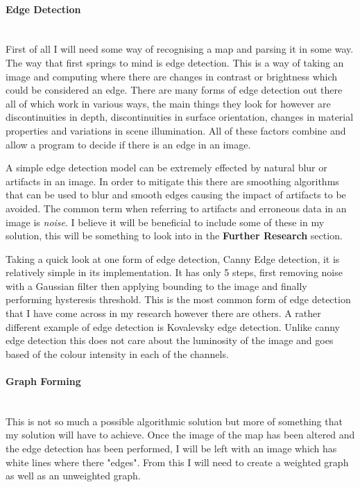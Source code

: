 \begin{flushleft}
            \paragraph{Edge Detection} \mbox{} \\
            First of all I will need some way of recognising a map and parsing it in some way. The way that first springs to mind is edge detection. This is a way of taking an image and computing where there
            are changes in contrast or brightness which could be considered an edge. There are many forms of edge detection out there all of which work in various ways, the main things they look for however
            are discontinuities in depth, discontinuities in surface orientation, changes in material properties and variations in scene illumination. All of these factors combine and allow a program to decide
            if there is an edge in an image. \\ \bk

            A simple edge detection model can be extremely effected by natural blur or artifacts in an image. In order to mitigate this there are smoothing algorithms that can be used to blur and smooth edges
            causing the impact of artifacts to be avoided. The common term when referring to artifacts and erroneous data in an image is \emph{noise}. I believe it will be beneficial to include some of these
            in my solution, this will be something to look into in the \textbf{Further Research} section. \\ \bk

            Taking a quick look at one form of edge detection, Canny Edge detection, it is relatively simple in its implementation. It has only 5 steps, first removing noise with a Gaussian filter then applying
            bounding to the image and finally performing hysteresis threshold. This is the most common form of edge detection that I have come across in my research however there are others. A rather
            different example of edge detection is Kovalevsky edge detection. Unlike canny edge detection this does not care about the luminosity of the image and goes based of the colour intensity in each
            of the channels. \\ \bk

            \paragraph{Graph Forming} \mbox{} \\
            This is not so much a possible algorithmic solution but more of something that my solution will have to achieve. Once the image of the map has been altered and the edge detection has been 
            performed, I will be left with an image which has white lines where there "edges". From this I will need to create a weighted graph as well as an unweighted graph. \\ \bk
            

\end{flushleft}
